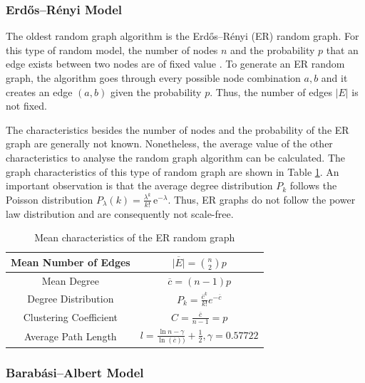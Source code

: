 \subsubsection{Erdős–Rényi Model}

The oldest random graph algorithm is the 
Erdős–Rényi (ER) random graph. For this type of random model, the
number of nodes $n$ and the probability $p$ that an 
edge exists between two nodes are of fixed value \cite{basicnetwork}. 
To generate an ER random graph, the algorithm goes through 
every possible node combination $a, b$ and it creates an edge 
$(a, b)$ given the probability $p$. 
Thus, the number of edges $|E|$ is not fixed.

The characteristics besides the number of nodes and the
probability of the ER graph are generally not known.
Nonetheless, the average value of the other
characteristics to analyse the random graph algorithm can be calculated.
The graph characteristics of this type of random graph are shown in Table 
\ref{erdos-model}.
An important observation is that 
the average degree distribution $P_k$ follows the Poisson distribution
$P_\lambda (k) = \frac{\lambda^k}{k!}\, \mathrm{e}^{-\lambda}$. Thus,
ER graphs do not follow the power law distribution and are consequently
not scale-free. 

\begin{table}[ht!]
    \centering
    \begin{tabular}{|c | c |} 
     \hline
     Mean Number of Edges & 
     $\overline{|E|} = \binom{n}{2}p$  \\ 
     \hline
     Mean Degree & 
     $\overline{c} = (n-1)p$ \\ 
     \hline
     Degree Distribution & 
     $P_k = \frac{\overline{c}^k}{k!} e^{-\overline{c}}$ \\ 
     \hline
     Clustering Coefficient & 
     $C=\frac{\overline{c}}{n-1}=p$ \\ 
     \hline
     Average Path Length \cite{averagepath}& 
     $l = \frac{\ln{n} - \gamma}{\ln(\overline{c}))} + \frac{1}{2}, 
     \gamma=0.57722$ \\ 
     \hline
    \end{tabular}
    \caption{Mean characteristics of the ER random graph \cite{basicnetwork}}
    \label{erdos-model}
\end{table}

\subsubsection{Barabási–Albert Model}

